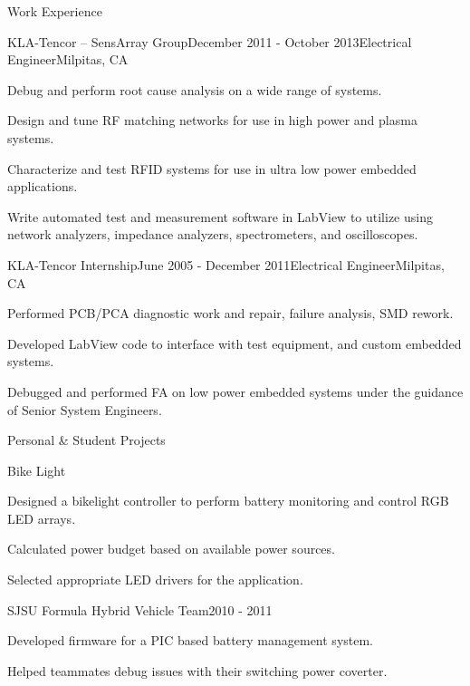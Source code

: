 \documentclass{resume} %
\begin{document}
\begin{rSection}{Work Experience}
\begin{rSubsection}{KLA-Tencor -- SensArray Group}{December 2011 - October 2013}{Electrical Engineer}{Milpitas, CA}
\item Debug and perform root cause analysis on a wide range of systems.
\item Design and tune RF matching networks for use in high power and plasma systems.
\item Characterize and test RFID systems for use in ultra low power embedded applications.
\item Write automated test and measurement software in LabView to utilize using network analyzers, impedance analyzers, spectrometers, and oscilloscopes.

\end{rSubsection}


\begin{rSubsection}{KLA-Tencor Internship}{June 2005 - December 2011}{Electrical Engineer}{Milpitas, CA}
\item Performed PCB/PCA diagnostic work and repair, failure analysis, SMD rework.
\item Developed LabView code to interface with test equipment, and custom embedded systems.
\item Debugged and performed FA on low power embedded systems under the guidance of Senior System Engineers. 
\end{rSubsection}

\end{rSection}


\begin{rSection}{Personal \& Student Projects}

\begin{rProject}{Bike Light}{}
\item Designed a bikelight controller to perform battery monitoring and control RGB LED arrays.
\item Calculated power budget based on available power sources.
\item Selected appropriate LED drivers for the application.
\end{rProject}

\begin{rProject}{SJSU Formula Hybrid Vehicle Team}{2010 - 2011}
\item Developed firmware for a PIC based battery management system.
\item Helped teammates debug issues with their switching power coverter.
\end{rProject}

\end{rSection}
\end{document}
